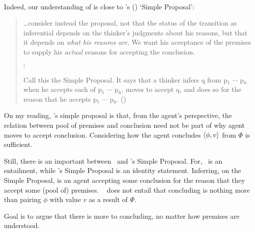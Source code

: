 \paragraph{\textcite{Wright:2014tt}}

\begin{note}
  Indeed, our understanding of \support{} is close to \citeauthor{Wright:2014tt}'s (\citeyear{Wright:2014tt}) `Simple Proposal':
  \begin{quote}
    \dots consider instead the proposal, not that the status of the transition as inferential depends on the thinker's judgments about his reasons, but that it depends on \emph{what his reasons are}.
    We want his acceptance of the premises to supply his \emph{actual} reasons for accepting the conclusion.

    \mbox{}\hfill\(\vdots\)\hfill\mbox{}

    Call this the Simple Proposal.
    It says that a thinker infers q from p\(_{1}\) \(\cdots\) p\(_{\text{n}}\) when he accepts each of p\(_{1}\) \(\cdots\) p\(_{\text{n}}\), moves to accept q, and does so for the reason that he accepts p\(_{1}\) \(\cdots\) p\(_{\text{n}}\).%
    \mbox{}\hfill\mbox{(\citeyear[33]{Wright:2014tt})}
  \end{quote}

  On my reading, \citeauthor{Wright:2014tt}'s simple proposal is that, from the agent's perspective, the relation between pool of premises and conclusion need not be part of why agent moves to accept conclusion.
  Considering how the agent concludes \(\langle \phi, v \rangle\) from \(\Phi\) is sufficient.

  Still, there is an important between~\supportI{} and \citeauthor{Wright:2014tt}'s Simple Proposal.
  For,~\supportI{} is an entailment, while \citeauthor{Wright:2014tt}'s Simple Proposal is an identity statement.
  Inferring, on the Simple Proposal, is an agent accepting some conclusion for the reason that they accept some (pool of) premises.
 ~\supportI{} does not entail that concluding is nothing more than pairing \(\phi\) with value \(v\) as a result of \(\Phi\).

  Goal is to argue that there is more to concluding, no matter how premises are understood.
\end{note}

\paragraph{\textcite{Broome:2002aa}}

